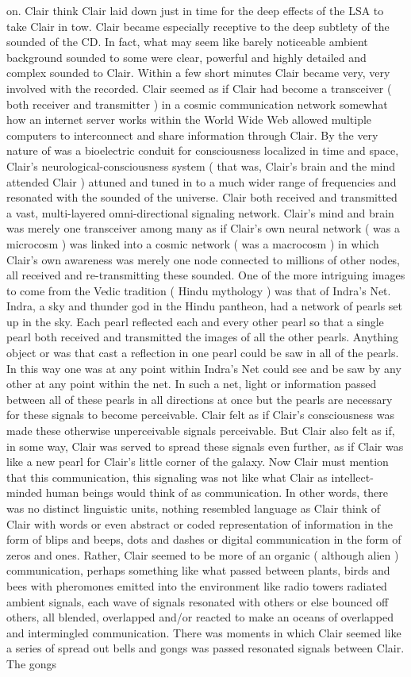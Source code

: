 \documentclass[12pt]{book}
\begin{document}
on. Clair think Clair laid down just in time for the deep effects of the LSA to take Clair in tow. Clair became especially receptive to the deep subtlety of the sounded of the CD. In fact, what may seem like barely noticeable ambient background sounded to some were clear, powerful and highly detailed and complex sounded to Clair. Within a few short minutes Clair became very, very involved with the recorded. Clair seemed as if Clair had become a transceiver ( both receiver and transmitter ) in a cosmic communication network somewhat how an internet server works within the World Wide Web allowed multiple computers to interconnect and share information through Clair. By the very nature of was a bioelectric conduit for consciousness localized in time and space, Clair's neurological-consciousness system ( that was, Clair's brain and the mind attended Clair ) attuned and tuned in to a much wider range of frequencies and resonated with the sounded of the universe. Clair both received and transmitted a vast, multi-layered omni-directional signaling network. Clair's mind and brain was merely one transceiver among many as if Clair's own neural network ( was a microcosm ) was linked into a cosmic network ( was a macrocosm ) in which Clair's own awareness was merely one node connected to millions of other nodes, all received and re-transmitting these sounded. One of the more intriguing images to come from the Vedic tradition ( Hindu mythology ) was that of Indra's Net. Indra, a sky and thunder god in the Hindu pantheon, had a network of pearls set up in the sky. Each pearl reflected each and every other pearl so that a single pearl both received and transmitted the images of all the other pearls. Anything object or was that cast a reflection in one pearl could be saw in all of the pearls. In this way one was at any point within Indra's Net could see and be saw by any other at any point within the net. In such a net, light or information passed between all of these pearls in all directions at once but the pearls are necessary for these signals to become perceivable. Clair felt as if Clair's consciousness was made these otherwise unperceivable signals perceivable. But Clair also felt as if, in some way, Clair was served to spread these signals even further, as if Clair was like a new pearl for Clair's little corner of the galaxy. Now Clair must mention that this communication, this signaling was not like what Clair as intellect-minded human beings would think of as communication. In other words, there was no distinct linguistic units, nothing resembled language as Clair think of Clair with words or even abstract or coded representation of information in the form of blips and beeps, dots and dashes or digital communication in the form of zeros and ones. Rather, Clair seemed to be more of an organic ( although alien ) communication, perhaps something like what passed between plants, birds and bees with pheromones emitted into the environment like radio towers radiated ambient signals, each wave of signals resonated with others or else bounced off others, all blended, overlapped and/or reacted to make an oceans of overlapped and intermingled communication. There was moments in which Clair seemed like a series of spread out bells and gongs was passed resonated signals between Clair. The gongs 
\end{document}
